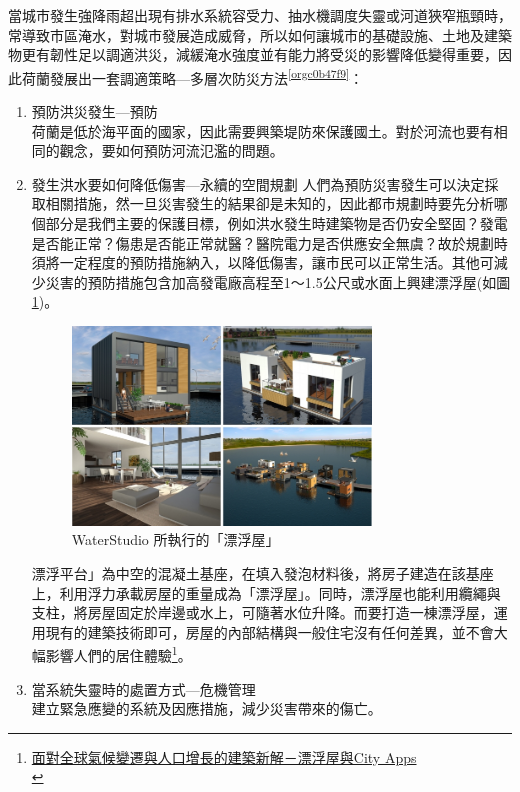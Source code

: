 \documentclass[a4paper,12pt]{article}
\begin{document}
\begin{enumerate}
\begin{enumerate}
當城市發生強降雨超出現有排水系統容受力、抽水機調度失靈或河道狹窄瓶頸時，常導致市區淹水，對城市發展造成威脅，所以如何讓城市的基礎設施、土地及建築物更有韌性足以調適洪災，減緩淹水強度並有能力將受災的影響降低變得重要，因此荷蘭發展出一套調適策略—多層次防災方法\textsuperscript{\ref{orgc0b47f9}}：\\
\begin{enumerate}
\item 預防洪災發生—預防\\
荷蘭是低於海平面的國家，因此需要興築堤防來保護國土。對於河流也要有相同的觀念，要如何預防河流氾濫的問題。\\
\item 發生洪水要如何降低傷害—永續的空間規劃   人們為預防災害發生可以決定採取相關措施，然一旦災害發生的結果卻是未知的，因此都市規劃時要先分析哪個部分是我們主要的保護目標，例如洪水發生時建築物是否仍安全堅固？發電是否能正常？傷患是否能正常就醫？醫院電力是否供應安全無虞？故於規劃時須將一定程度的預防措施納入，以降低傷害，讓市民可以正常生活。其他可減少災害的預防措施包含加高發電廠高程至1～1.5公尺或水面上興建漂浮屋(如圖\ref{fig:Floating-1})。\\
\begin{figure}[htbp]
\centering
\includegraphics[width=300]{images/floatingx4.jpg}
\caption{\label{fig:Floating-1}WaterStudio 所執行的「漂浮屋」}
\end{figure}
漂浮平台」為中空的混凝土基座，在填入發泡材料後，將房子建造在該基座上，利用浮力承載房屋的重量成為「漂浮屋」。同時，漂浮屋也能利用纜繩與支柱，將房屋固定於岸邊或水上，可隨著水位升降。而要打造一棟漂浮屋，運用現有的建築技術即可，房屋的內部結構與一般住宅沒有任何差異，並不會大幅影響人們的居住體驗\footnote{\href{https://www.oranjeexpress.com/2013/09/29/\%E9\%9D\%A2\%E5\%B0\%8D\%E5\%85\%A8\%E7\%90\%83\%E6\%B0\%A3\%E5\%80\%99\%E8\%AE\%8A\%E9\%81\%B7\%E8\%88\%87\%E4\%BA\%BA\%E5\%8F\%A3\%E5\%A2\%9E\%E9\%95\%B7\%E7\%9A\%84\%E5\%BB\%BA\%E7\%AF\%89\%E6\%96\%B0\%E8\%A7\%A3-\%E6\%BC\%82\%E6\%B5\%AE\%E5\%B1\%8B\%E8\%88\%87/}{面對全球氣候變遷與人口增長的建築新解－漂浮屋與City Apps}\\}。\\
\item 當系統失靈時的處置方式—危機管理\\
建立緊急應變的系統及因應措施，減少災害帶來的傷亡。\\
\end{enumerate}


\end{enumerate}
\end{enumerate}
\end{document}
